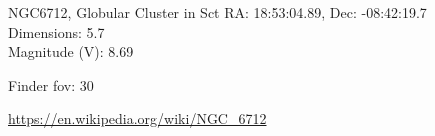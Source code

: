 \begin{block}{NGC6712, Globular Cluster in Sct}
    RA: 18:53:04.89, Dec: -08:42:19.7 \\ 
    Dimensions: 5.7 \\ 
    Magnitude (V): 8.69



    Finder fov: 30 

    \url{https://en.wikipedia.org/wiki/NGC_6712} 
\end{block}